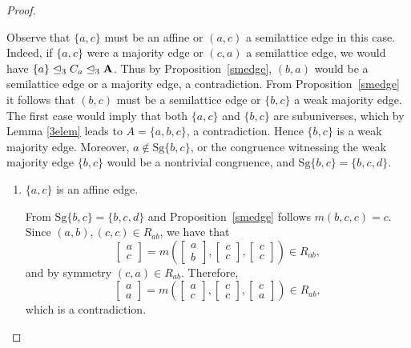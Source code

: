 \documentclass[11pt]{amsart}
\newcommand{\m}[1]{\mathbf{\uppercase{#1}}}
\theoremstyle{definition}
\theoremstyle{remark}
\theoremstyle{plain}
\begin{document}
\begin{proof}
\begin{enumerate}[wide, labelwidth=!,itemindent=!,labelindent=0pt]
\begin{enumerate}[wide, labelwidth=!,labelindent=0pt,itemindent=!]
    Observe that $\{a,c\}$ must be an affine or $(a,c)$ a semilattice edge in this case. Indeed, if $\{a,c\}$ were a majority edge or $(c,a)$ a semilattice edge, we would have $\{a\}\trianglelefteq_3 C_a \trianglelefteq_3 \m a$. Thus by Proposition~\ref{smedge}, $(b,a)$ would be a semilattice edge or a majority edge, a contradiction. From Proposition~\ref{smedge} it follows that $(b,c)$ must be a semilattice edge or $\{b,c\}$ a weak majority edge. The first case would imply that both $\{a,c\}$ and $\{b,c\}$ are subuniverses, which by Lemma \ref{3elem} leads to $A=\{a,b,c\}$, a contradiction. Hence $\{b,c\}$ is a weak majority edge. Moreover, $a\notin \mathrm{Sg}\{b,c\}$, or the congruence witnessing the weak majority edge $\{b,c\}$ would be a nontrivial congruence, and $\mathrm{Sg}\{b,c\}=\{b,c,d\}$.

    

\begin{enumerate}[wide, labelwidth=!,labelindent=0pt,itemindent=!]
    \item[\sc{Subsubcase 2a1}.] $\{a,c\}$ is an affine edge.


From $\mathrm{Sg}\{b,c\}=\{b,c,d\}$ and Proposition~\ref{smedge} follows $m(b,c,c)=c$. Since $(a,b), (c,c)\in R_{ab}$, we have that
$$
\begin{bmatrix}
a \\
c
\end{bmatrix}=
m\left(
\begin{bmatrix}
a \\
b
\end{bmatrix}, 
\begin{bmatrix}
c \\
c
\end{bmatrix},
\begin{bmatrix}
c \\
c
\end{bmatrix}
\right)\in R_{ab},
$$
and by symmetry $(c,a)\in R_{ab}$. Therefore,
$$
\begin{bmatrix}
a \\
a
\end{bmatrix}=
m\left(
\begin{bmatrix}
a \\
c
\end{bmatrix}, 
\begin{bmatrix}
c \\
c
\end{bmatrix},
\begin{bmatrix}
c \\
a
\end{bmatrix}
\right)\in R_{ab},
$$
which is a contradiction.


\end{enumerate}
\end{enumerate}
\end{enumerate}
\end{proof}
\end{document}
